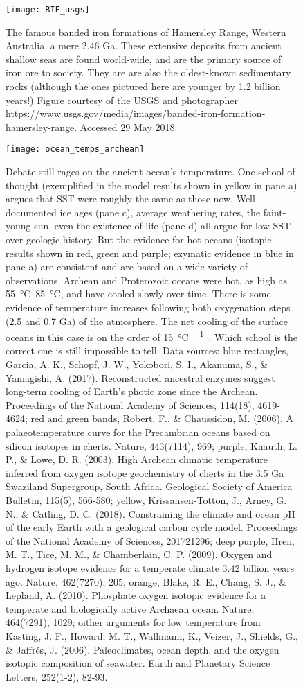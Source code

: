 \documentclass[amstex,12pt]{book}
\begin{document}
{\newpage
\begin{figure}[ht]
\centering
\texttt{[image: BIF\_usgs]}%
\caption{The famous banded iron formations of Hamersley Range, Western Australia, a mere 2.46 Ga. These extensive deposits from ancient shallow seas are found world-wide, and are the primary source of iron ore to society. They are are also the oldest-known sedimentary rocks (although the ones pictured here are younger by 1.2 billion years!) Figure courtesy of the USGS and photographer https://www.usgs.gov/media/images/banded-iron-formation-hamersley-range. Accessed 29 May 2018.}   
\label{fig:bif}
\end{figure}


\newpage
\begin{figure}[ht]
\centering
\texttt{[image: ocean\_temps\_archean]}%
\caption{Debate still rages on the ancient ocean's temperature. One school of thought (exemplified in the model results shown in yellow in pane a) argues that SST were roughly the same as those now. Well-documented ice ages (pane c), average weathering rates, the faint-young sun, even the existence of life (pane d) all argue for low SST over geologic history. But the evidence for hot oceans (isotopic results shown in red, green and purple; ezymatic evidence in blue in pane a) are consistent and are based on a wide variety of observations. Archean and Proterozoic oceans were hot, as high as \SIrange{55}{85}{\celsius}, and have cooled slowly over time. There is some evidence of temperature increases following both oxygenation steps (2.5 and 0.7 Ga) of the atmosphere. The net cooling of the surface oceans in this case is on the order of \SI[per-mode=symbol]{15}{\celsius\per\giga\year}. Which school is the correct one is still impossible to tell. Data sources: blue rectangles, Garcia, A. K., Schopf, J. W., Yokobori, S. I., Akanuma, S., \& Yamagishi, A. (2017). Reconstructed ancestral enzymes suggest long-term cooling of Earth’s photic zone since the Archean. Proceedings of the National Academy of Sciences, 114(18), 4619-4624; red and green bands, Robert, F., \& Chaussidon, M. (2006). A palaeotemperature curve for the Precambrian oceans based on silicon isotopes in cherts. Nature, 443(7114), 969; purple, Knauth, L. P., \& Lowe, D. R. (2003). High Archean climatic temperature inferred from oxygen isotope geochemistry of cherts in the 3.5 Ga Swaziland Supergroup, South Africa. Geological Society of America Bulletin, 115(5), 566-580; yellow, Krissansen-Totton, J., Arney, G. N., \& Catling, D. C. (2018). Constraining the climate and ocean pH of the early Earth with a geological carbon cycle model. Proceedings of the National Academy of Sciences, 201721296; deep purple, Hren, M. T., Tice, M. M., \& Chamberlain, C. P. (2009). Oxygen and hydrogen isotope evidence for a temperate climate 3.42 billion years ago. Nature, 462(7270), 205; orange, Blake, R. E., Chang, S. J., \& Lepland, A. (2010). Phosphate oxygen isotopic evidence for a temperate and biologically active Archaean ocean. Nature, 464(7291), 1029; oither arguments for low temperature from Kasting, J. F., Howard, M. T., Wallmann, K., Veizer, J., Shields, G., \& Jaffrés, J. (2006). Paleoclimates, ocean depth, and the oxygen isotopic composition of seawater. Earth and Planetary Science Letters, 252(1-2), 82-93.}   

\end{figure}}
\end{document}
